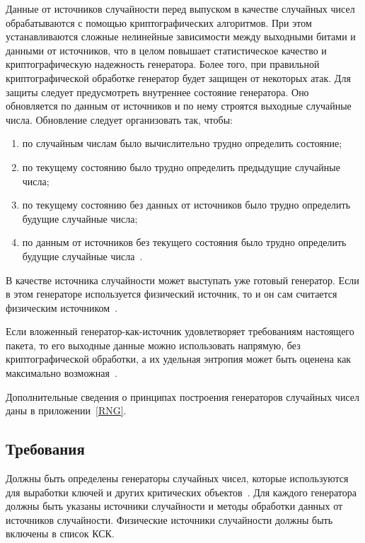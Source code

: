 Данные от источников случайности перед выпуском в качестве случайных чисел
обрабатываются с помощью криптографических алгоритмов. При этом устанавливаются
сложные нелинейные зависимости между выходными битами и данными от источников, 
что в целом повышает статистическое качество и криптографическую надежность
генератора. 
%
Более того, при правильной криптографической обработке генератор будет 
защищен от некоторых атак. Для защиты следует предусмотреть внутреннее 
состояние генератора. Оно обновляется по данным от источников и по нему 
строятся выходные случайные числа. Обновление следует организовать  
так, чтобы:
\begin{enumerate}[label=\arabic*)]
\item
по случайным числам было вычислительно трудно определить состояние;
\item
по текущему состоянию было трудно определить предыдущие случайные числа;
\item
по текущему состоянию без данных от источников было трудно определить будущие
случайные числа;
\item
по данным от источников без текущего состояния было трудно определить будущие
случайные числа~.
\end{enumerate}

В качестве источника случайности может выступать уже готовый генератор.
Если в этом генераторе используется физический источник, то и он сам считается 
физическим источником~.

Если вложенный генератор-как-источник удовлетворяет требованиям настоящего пакета, 
то его выходные данные можно использовать напрямую, без криптографической
обработки, а их удельная энтропия может быть оценена как максимально 
возможная~.

Дополнительные сведения о принципах построения генераторов 
случайных чисел даны в приложении~\ref{RNG}.

\subsection{Требования}\label{RN.Reqs}

\label{R.RN.Spec} %
Должны быть определены генераторы случайных чисел, которые используются для
выработки ключей и других критических объектов~.
%
Для каждого генератора должны быть указаны источники случайности и методы
обработки данных от источников случайности.
%
Физические источники случайности должны быть~ включены в
список КСК.

